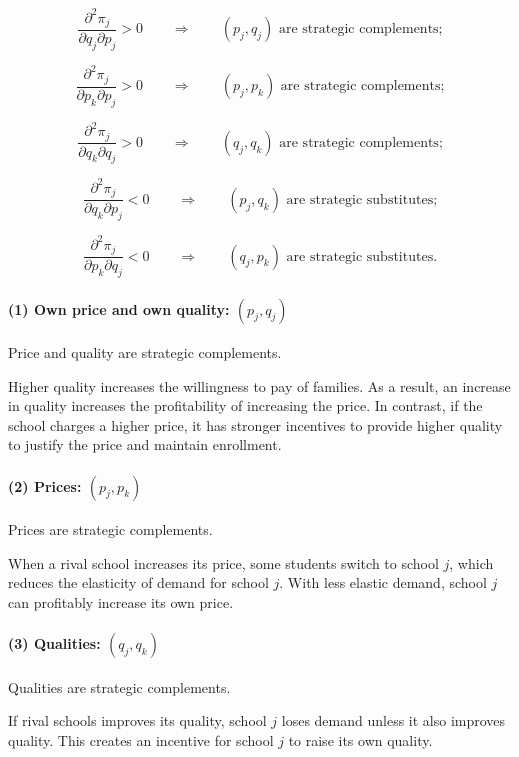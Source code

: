\documentclass[12pt]{article}
\begin{document}
\[
\frac{\partial^2 \pi_j}{\partial q_j \partial p_j}>0
\qquad\Rightarrow\qquad
(p_j,q_j)\text{ are strategic complements;}
\]

\[
\frac{\partial^2 \pi_j}{\partial p_k \partial p_j}>0
\qquad\Rightarrow\qquad
(p_j,p_k)\text{ are strategic complements;}
\]

\[
\frac{\partial^2 \pi_j}{\partial q_k \partial q_j}>0
\qquad\Rightarrow\qquad
(q_j,q_k)\text{ are strategic complements;}
\]

\[
\frac{\partial^2 \pi_j}{\partial q_k \partial p_j}<0
\qquad\Rightarrow\qquad
(p_j,q_k)\text{ are strategic substitutes;}
\]

\[
\frac{\partial^2 \pi_j}{\partial p_k \partial q_j}<0
\qquad\Rightarrow\qquad
(q_j,p_k)\text{ are strategic substitutes.}
\]

\paragraph{(1) Own price and own quality: $(p_j,q_j)$}

Price and quality are strategic complements.

Higher quality increases the willingness to pay of families. As a result, an increase in quality increases the profitability of increasing the price. In contrast, if the school charges a higher price, it has stronger incentives to provide higher quality to justify the price and maintain enrollment.

\paragraph{(2) Prices: $(p_j,p_k)$}

Prices are strategic complements.

When a rival school increases its price, some students switch to school $j$, which reduces the elasticity of demand for school $j$. With less elastic demand, school $j$ can profitably increase its own price.

\paragraph{(3) Qualities: $(q_j,q_k)$}

Qualities are strategic complements.

If rival schools improves its quality, school $j$ loses demand unless it also improves quality. This creates an  incentive for school $j$ to raise its own quality.
\end{document}
